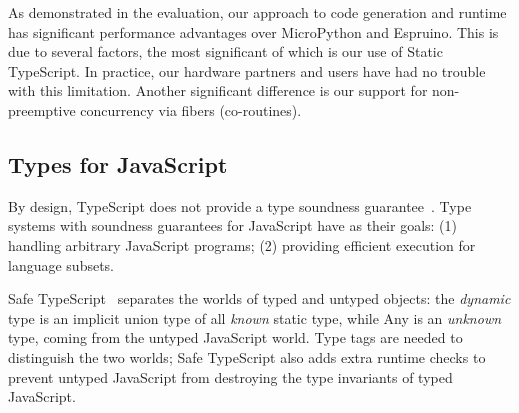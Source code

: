 As demonstrated in the evaluation, our approach to code generation and runtime
has significant performance advantages over MicroPython and Espruino.
This is due to several factors, the most significant of which is our use of
Static TypeScript. In practice, our hardware partners and users have had no
trouble with this limitation.  Another significant difference is our support
for non-preemptive concurrency via fibers (co-routines). 











\subsection{Types for JavaScript}

By design, TypeScript does not provide a type soundness guarantee~\cite{BiermanAT14}.
Type systems with soundness guarantees for JavaScript have as their
goals: (1) handling arbitrary JavaScript programs; 
(2) providing efficient execution for language subsets.

Safe TypeScript~\cite{SafeTypeScript15} separates the worlds of typed and untyped 
objects: the \emph{dynamic} type is an implicit union type of all \emph{known} static type, 
while Any is an \emph{unknown} type, coming from the untyped JavaScript world. Type tags 
are needed to distinguish the two worlds; Safe TypeScript also adds extra runtime checks
to prevent untyped JavaScript from destroying the type invariants of typed JavaScript.  


